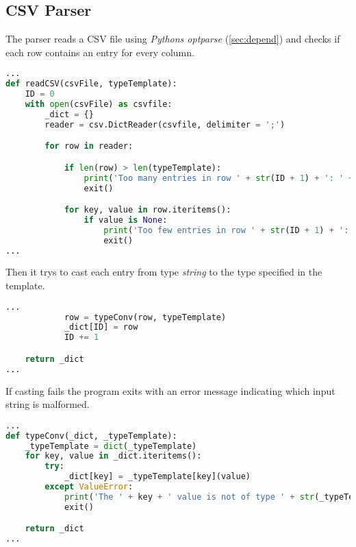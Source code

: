 \subsection{CSV Parser}
\label{sec:csvparse}

The parser reads a CSV file using \textit{Pythons optparse} (\ref{sec:depend}) and checks if each row contains an entry for every column.

\begin{inconsolata}
\begin{minipage}{\linewidth}
\begin{lstlisting}[language=python]
...
def readCSV(csvFile, typeTemplate):
    ID = 0
    with open(csvFile) as csvfile:
        _dict = {}
        reader = csv.DictReader(csvfile, delimiter = ';')

        for row in reader:

            if len(row) > len(typeTemplate):
                print('Too many entries in row ' + str(ID + 1) + ': ' + csvFile)
                exit()

            for key, value in row.iteritems():
                if value is None:
                    print('Too few entries in row ' + str(ID + 1) + ': ' + csvFile)
                    exit()
...
\end{lstlisting}
\end{minipage}
\end{inconsolata}

Then it trys to cast each entry from type \textit{string} to the type specified in the template.

\begin{inconsolata}
\begin{minipage}{\linewidth}
\begin{lstlisting}[language=python]
...
            row = typeConv(row, typeTemplate)
            _dict[ID] = row
            ID += 1

    return _dict
...
\end{lstlisting}
\end{minipage}
\end{inconsolata}

If casting fails the program exits with an error message indicating which input string is malformed.

\begin{inconsolata}
\begin{minipage}{\linewidth}
\begin{lstlisting}[language=python]
...
def typeConv(_dict, _typeTemplate):
    _typeTemplate = dict(_typeTemplate)
    for key, value in _dict.iteritems():
        try:
            _dict[key] = _typeTemplate[key](value)
        except ValueError:
            print('The ' + key + ' value is not of type ' + str(_typeTemplate[key]) + '.')
            exit()

    return _dict
...
\end{lstlisting}
\end{minipage}
\end{inconsolata}

